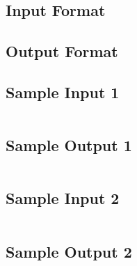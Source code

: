 \subsection*{Input Format}

\subsection*{Output Format}

\subsection*{Sample Input 1}
\begin{verbatim}
\end{verbatim}

\subsection*{Sample Output 1}
\begin{verbatim}
\end{verbatim}

\subsection*{Sample Input 2}
\begin{verbatim}
\end{verbatim}

\subsection*{Sample Output 2}
\begin{verbatim}
\end{verbatim}





